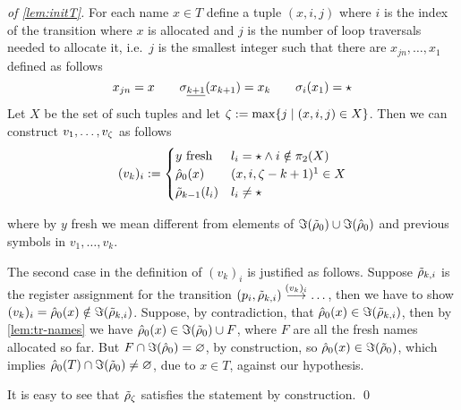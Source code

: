 \begin{proof}[of \cref{lem:initT}]
For each name $x \in T$ define a tuple $(x,i,j)$ where $i$ is the index of the transition where $x$ is allocated and $j$ is the number of loop traversals needed to allocate it, i.e.\ $j$ is the smallest integer such that there are $x_{jn},\dots,x_1$ defined as follows
\[
	x_{jn} = x \qquad \sigma_{\underline{k+1}}(x_{k+1}) = x_k \qquad \sigma_i(x_1) = \star
\]
Let $X$ be the set of such tuples and let $\zeta := \max \{ j \mid (x,i,j) \in X \}$. Then we can construct $v_1,\dots,v_\zeta$ as follows
\[
	(v_k)_i :=
	\begin{cases}
		\text{$y$ fresh} & l_i = \star \land i \notin \pi_2(X) \\
		\rrho_0(x) & (x,i,\ass - k + 1)\footnotemark \in X
		 \\
		\trho_{k-1}(l_i) & l_i \neq \star
	\end{cases}
\]

where by $y$ fresh we mean different from elements of $\Im(\tilde{\rho}_0) \cup \Im(\hat{\rho}_0)$ and previous symbols in $v_1,\dots,v_{k}$.

The second case in the definition of $(v_k)_i$ is justified as follows. Suppose $\tilde{\rho}_{k,i}$ is the register assignment for the transition $(p_i,\tilde{\rho}_{k,i}) \overset{(v_k)_i}{\longrightarrow} \dots$, then we have to show $(v_k)_i = \hat{\rho}_0(x) \notin \Im(\tilde{\rho}_{k,i})$. Suppose, by contradiction, that $\hat{\rho}_0(x) \in \Im(\tilde{\rho}_{k,i})$, then by \cref{lem:tr-names} we have $\hat{\rho}_0(x) \in \Im(\tilde{\rho}_0) \cup F$, where $F$ are all the fresh names allocated so far. But $F \cap \Im(\hat{\rho}_0) = \varnothing$, by construction, so $\hat{\rho}_0(x) \in \Im(\tilde{\rho}_0)$, which implies $\hat{\rho}_0(T) \cap \Im(\tilde{\rho}_0) \neq \varnothing$, due to $x \in T$, against our hypothesis.

It is easy to see that $\tilde{\rho}_\zeta$ satisfies the statement by construction.
\qed
\end{proof}

